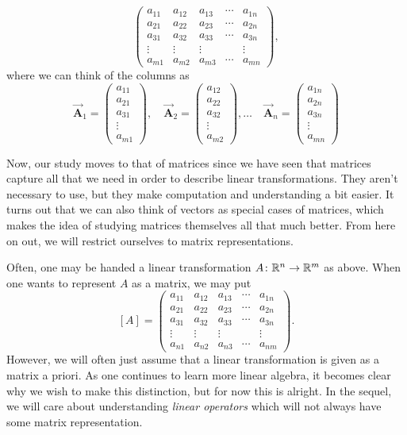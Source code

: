        \[
        \begin{pmatrix}
        a_{11} & a_{12} & a_{13} & \cdots & a_{1n}\\
        a_{21} & a_{22} & a_{23} & \cdots & a_{2n}\\
        a_{31} & a_{32} & a_{33} & \cdots & a_{3n}\\
        \vdots & \vdots & \vdots & & \vdots \\
        a_{m1} & a_{m2} & a_{m3} & \cdots & a_{mn}
        \end{pmatrix},
        \]
        where we can think of the columns as
        \[
            \boldsymbol{\vec{A}}_1 = \begin{pmatrix} a_{11} \\ a_{21} \\ a_{31} \\ \vdots \\ a_{m1} \end{pmatrix}, \quad \boldsymbol{\vec{A}}_2 = \begin{pmatrix} a_{12} \\ a_{22} \\ a_{32} \\ \vdots \\ a_{m2} \end{pmatrix},\dots \quad \boldsymbol{\vec{A}}_n = \begin{pmatrix} a_{1n} \\ a_{2n} \\ a_{3n} \\ \vdots \\ a_{mn} \end{pmatrix}
        \]
        
        Now, our study moves to that of matrices since we have seen that matrices capture all that we need in order to describe linear transformations.  They aren't necessary to use, but they make computation and understanding a bit easier.  It turns out that we can also think of vectors as special cases of matrices, which makes the idea of studying matrices themselves all that much better. From here on out, we will restrict ourselves to matrix representations.  
        
        Often, one may be handed a linear transformation $A\colon \mathbb{R}^n \to \mathbb{R}^m$ as above. When one wants to represent $A$ as a matrix, we may put
        \[
        [A]=        \begin{pmatrix}
        a_{11} & a_{12} & a_{13} & \cdots & a_{1n}\\
        a_{21} & a_{22} & a_{23} & \cdots & a_{2n}\\
        a_{31} & a_{32} & a_{33} & \cdots & a_{3n}\\
        \vdots & \vdots & \vdots & & \vdots \\
        a_{n1} & a_{n2} & a_{n3} & \cdots & a_{nm}
        \end{pmatrix}.
        \]
        However, we will often just assume that a linear transformation is given as a matrix a priori.  As one continues to learn more linear algebra, it becomes clear why we wish to make this distinction, but for now this is alright.  In the sequel, we will care about understanding \emph{linear operators} which will not always have some matrix representation.
        
